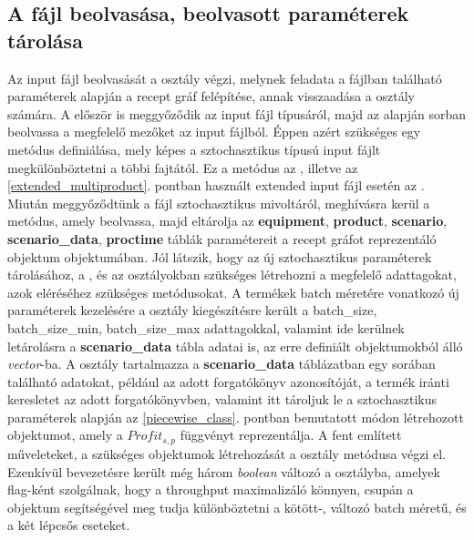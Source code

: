 \subsection{A fájl beolvasása, beolvasott paraméterek tárolása} \label{inputReader}
Az input fájl beolvasását a  osztály végzi, melynek feladata a fájlban található paraméterek alapján a recept gráf felépítése, annak visszaadása a osztály számára.
A  először is meggyőződik az input fájl típusáról, majd az alapján sorban beolvassa a megfelelő mezőket az input fájlból.
Éppen azért szükséges egy metódus definiálása, mely képes a sztochasztikus típusú input fájlt megkülönböztetni a többi fajtától.
Ez a metódus az , illetve az \ref{extended_multiproduct}. pontban használt extended input fájl esetén az .
Miután meggyőződtünk a fájl sztochasztikus mivoltáról, meghívásra kerül a  metódus, amely beolvassa, majd eltárolja az \textbf{equipment}, \textbf{product}, \textbf{scenario}, \textbf{scenario\_data}, \textbf{proctime} táblák paramétereit a recept gráfot reprezentáló  objektum  objektumában.
Jól látszik, hogy az új sztochasztikus paraméterek tárolásához, a , és az  osztályokban szükséges létrehozni a megfelelő adattagokat, azok eléréséhez szükséges metódusokat.
A termékek batch méretére vonatkozó új paraméterek kezelésére a  osztály kiegészítésre került a batch\_size, batch\_size\_min, batch\_size\_max adattagokkal, valamint ide kerülnek letárolásra a \textbf{scenario\_data} tábla adatai is, az erre definiált  objektumokból álló \textit{vector}-ba.
A  osztály tartalmazza a \textbf{scenario\_data} táblázatban egy sorában található adatokat, például az adott forgatókönyv azonosítóját, a termék iránti keresletet az adott forgatókönyvben, valamint itt tároljuk le a sztochasztikus paraméterek alapján az \ref{piecewise_class}. pontban bemutatott módon létrehozott  objektumot, amely a $Profit_{s,p}$ függvényt reprezentálja.
A fent említett műveleteket, a szükséges objektumok létrehozását a  osztály  metódusa végzi el.
Ezenkívül bevezetésre került még három \textit{boolean} változó a  osztályba,  amelyek flag-ként szolgálnak, hogy a throughput maximalizáló könnyen, csupán a  objektum segítségével meg tudja különböztetni a kötött-, változó batch méretű, és a két lépcsős eseteket.
